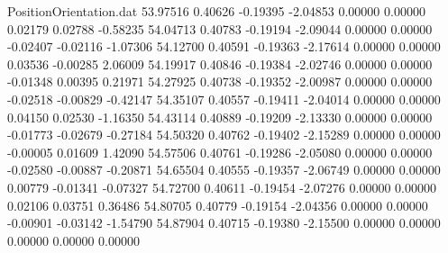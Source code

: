 \begin{filecontents}{PositionOrientation.dat}
  53.97516    0.40626   -0.19395    -2.04853    0.00000    0.00000    0.02179    0.02788   -0.58235
  54.04713    0.40783   -0.19194    -2.09044    0.00000    0.00000   -0.02407   -0.02116   -1.07306
  54.12700    0.40591   -0.19363    -2.17614    0.00000    0.00000    0.03536   -0.00285    2.06009
  54.19917    0.40846   -0.19384    -2.02746    0.00000    0.00000   -0.01348    0.00395    0.21971
  54.27925    0.40738   -0.19352    -2.00987    0.00000    0.00000   -0.02518   -0.00829   -0.42147
  54.35107    0.40557   -0.19411    -2.04014    0.00000    0.00000    0.04150    0.02530   -1.16350
  54.43114    0.40889   -0.19209    -2.13330    0.00000    0.00000   -0.01773   -0.02679   -0.27184
  54.50320    0.40762   -0.19402    -2.15289    0.00000    0.00000   -0.00005    0.01609    1.42090
  54.57506    0.40761   -0.19286    -2.05080    0.00000    0.00000   -0.02580   -0.00887   -0.20871
  54.65504    0.40555   -0.19357    -2.06749    0.00000    0.00000    0.00779   -0.01341   -0.07327
  54.72700    0.40611   -0.19454    -2.07276    0.00000    0.00000    0.02106    0.03751    0.36486
  54.80705    0.40779   -0.19154    -2.04356    0.00000    0.00000   -0.00901   -0.03142   -1.54790
  54.87904    0.40715   -0.19380    -2.15500    0.00000    0.00000    0.00000    0.00000    0.00000
\end{filecontents}